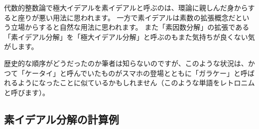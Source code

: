 \documentclass[11pt,b5paper,oneside,titlepage,lualatex]{ltjsreport}
\begin{document}
\begin{ringnote}
	代数的整数論で極大イデアルを素イデアルと呼ぶのは、環論に親しんだ身からすると座りが悪い用法に思われます。
	一方で素イデアルは素数の拡張概念だという立場からすると自然な用法に思われます。
	また「素因数分解」の拡張である「素イデアル分解」を「極大イデアル分解」と呼ぶのもまた気持ちが良くない気がします。
	
	歴史的な順序がどうだったのか筆者は知らないのですが、このような状況は、かつて「ケータイ」と呼んでいたものがスマホの登場とともに「ガラケー」と呼ばれるようになったことに似ているかもしれません（このような単語をレトロニムと呼びます）。
\end{ringnote}



\section{素イデアル分解の計算例} \label{sec:素イデアル分解の計算例}







\clearpage






\chapter{} \label{chap:}






\section{} \label{sec:}




\end{document}
